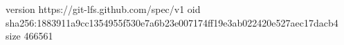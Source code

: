 version https://git-lfs.github.com/spec/v1
oid sha256:1883911a9cc1354955f530e7a6b23e007174ff19e3ab022420e527aec17dacb4
size 466561
